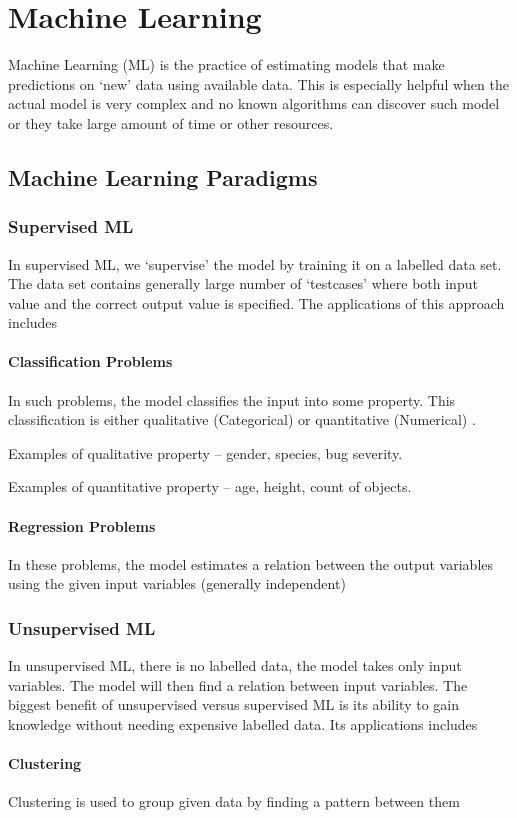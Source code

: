 \section{Machine Learning}
Machine Learning (ML) is the practice of estimating models that make predictions on `new' data using available data. This is especially helpful when the actual model is very complex and no known algorithms can discover such model or they take large amount of time or other resources. 
\subsection{Machine Learning Paradigms}
\subsubsection{Supervised ML}
In supervised ML, we `supervise' the model by training it on a labelled data set. The data set contains generally large number of `testcases' where both input value and the correct output value is specified. The applications of this approach includes
\paragraph{Classification Problems}
In such problems, the model classifies the input into some property. This classification is either qualitative (Categorical) or quantitative (Numerical) .

Examples of qualitative property -- gender, species, bug severity.

Examples of quantitative property -- age, height, count of objects.
\paragraph{Regression Problems}
In these problems, the model estimates a relation between the output variables using the given input variables (generally independent)
\subsubsection{Unsupervised ML}
In unsupervised ML, there is no labelled data, the model takes only input variables. The model will then find a relation between input variables. The biggest benefit of unsupervised versus supervised ML is its ability to gain knowledge without needing expensive labelled data. Its applications includes
\paragraph{Clustering}
Clustering is used to group given data by finding a pattern between them
